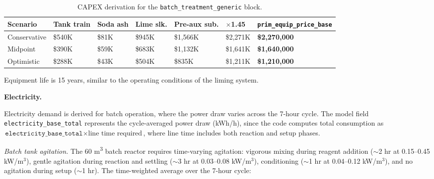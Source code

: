\begin{table}[h!]
\caption{CAPEX derivation for the \texttt{batch\_treatment\_generic} block.}
\centering
\begin{tabular}{>{\raggedright\arraybackslash}p{2.2cm}
				>{\raggedright\arraybackslash}p{2.0cm}
				>{\raggedright\arraybackslash}p{1.6cm}
				>{\raggedright\arraybackslash}p{1.6cm}
				>{\raggedright\arraybackslash}p{2.0cm}
				>{\raggedright\arraybackslash}p{1.6cm}
				>{\raggedright\arraybackslash}p{3cm}}
\toprule
\textbf{Scenario} & \textbf{Tank train} & \textbf{Soda ash} & \textbf{Lime slk.} & \textbf{Pre-aux sub.} & \textbf{$\times$1.45} & \texttt{prim\_equip\_price\_base} \\
\midrule
Conservative & \$540K & \$81K & \$945K & \$1,566K & \$2,271K & \textbf{\$2,270,000} \\
Midpoint     & \$390K & \$59K & \$683K & \$1,132K & \$1,641K & \textbf{\$1,640,000} \\
Optimistic   & \$288K & \$43K & \$504K & \$835K  & \$1,211K & \textbf{\$1,210,000} \\
\bottomrule
\end{tabular}
\end{table}

\noindent Equipment life is 15 years, similar to the operating conditions of the liming system. 

\medskip
\noindent\textbf{Electricity.}\quad

Electricity demand is derived for batch operation, where the power draw varies across the 7-hour cycle. The model field \texttt{electricity\_base\_total} represents the cycle-averaged power draw (kWh/h), since the code computes total consumption as $\texttt{electricity\_base\_total} \times \text{line time required}$, where line time includes both reaction and setup phases.

\textit{Batch tank agitation.} The 60 \si{m^3} batch reactor requires time-varying agitation: vigorous mixing during reagent addition ($\sim$2 hr at 0.15--0.45 kW/m$^3$), gentle agitation during reaction and settling ($\sim$3 hr at 0.03--0.08 kW/m$^3$), conditioning ($\sim$1 hr at 0.04--0.12 kW/m$^3$), and no agitation during setup ($\sim$1 hr). The time-weighted average over the 7-hour cycle:

